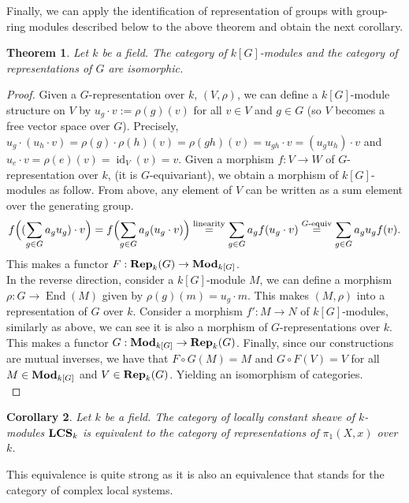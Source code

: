 \documentclass{article}
\theoremstyle{plain}
\newtheorem{theorem}{Theorem}[subsection]
\newtheorem{corollary}[theorem]{Corollary}
\theoremstyle{definition}
\DeclareMathOperator{\End}{End}
\DeclareMathOperator{\id}{id}
\DeclareMathOperator{\Rep}{\bf{Rep}}
\DeclareMathOperator{\LCS}{\bf{LCS}}
\DeclareMathOperator{\Mod}{\bf{Mod}}
\begin{document}
\noindent Finally, we can apply the identification of representation of groups with group-ring modules described below to the above theorem and obtain the next corollary. 

\begin{theorem}
    Let $k$ be a field.
    The category of $k[G]$-modules and the category of representations of $G$ are isomorphic.
\end{theorem}
\begin{proof}
    Given a $G$-representation over $k$, $(V,\rho)$, we can define a $k[G]$-module structure on $V$ by $u_g\cdot v := \rho(g)(v)$ for all $v\in V$ and $g\in G$ (so $V$ becomes a free vector space over $G$). 
    Precisely, $u_g\cdot(u_h\cdot v) = \rho(g)\cdot \rho(h)(v) = \rho(gh)(v) = u_{gh}\cdot v = (u_gu_h)\cdot v$ and $u_e\cdot v= \rho(e)(v)=\id_V(v) = v$.
    Given a morphism $f:V\rightarrow W$ of $G$-representation over $k$,  (it is $G$-equivariant), we obtain a morphism of $k[G]$-modules as follow. From above, any element of $V$ can be written as a sum element over the generating group.
    $$f \Bigl( (\sum_{g\in G} a_gu_g)\cdot v \Bigr) = f \Bigl( \sum_{g\in G} a_g(u_g\cdot v) \Bigr) \stackrel{\text{linearity}}{=} \sum_{g\in G} a_g f(u_g\cdot v) \stackrel{G\text{-equiv}}{=} \sum_{g\in G} a_g u_gf(v).$$
    This makes a functor $F :\Rep_k(G) \rightarrow\Mod_{k[G]}$.\\
    In the reverse direction, consider a $k[G]$-module $M$, we can define a morphism $\rho: G\rightarrow \End(M)$ given by $\rho(g)(m) = u_g\cdot m$. This makes $(M,\rho)$ into a representation of $G$ over $k$.
    Consider a morphism $f':M\rightarrow N$ of $k[G]$-modules, similarly as above, we can see it is also a morphism of $G$-representations over $k$.
    This makes a functor $G:\Mod_{k[G]} \rightarrow \Rep_k(G)$.
    Finally, since our constructions are mutual inverses, we have that $F\circ G (M) = M$ and $G\circ F(V)=V$ for all $M\in \Mod_{k[G]}$ and $V\in \Rep_k(G)$. Yielding an isomorphism of categories.\\
\end{proof}


\begin{corollary}
\label{corollary_Rpi_mod}
    Let $k$ be a field. 
    The category of locally constant sheave of $k$-modules $\LCS_k$ is equivalent to the category of representations of $\pi_1(X,x)$ over $k$.
\end{corollary}



\noindent This equivalence is quite strong as it is also an equivalence that stands for the category of complex local systems.
\end{document}
